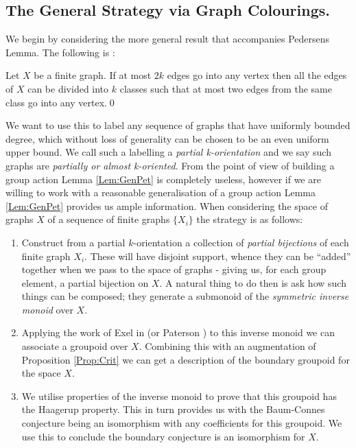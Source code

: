 \begin{conjecture}
\subsection{The General Strategy via Graph Colourings.}

We begin by considering the more general result that accompanies Pedersens Lemma. The following is \cite[Theorem 6, Chapter XI]{MR1035708}:

\begin{lemma}\label{Lem:GenPet}
Let $X$ be a finite graph. If at most $2k$ edges go into any vertex then all the edges of $X$ can be divided into $k$ classes such that at most two edges from the same class go into any vertex.\qed
\end{lemma}

We want to use this to label any sequence of graphs that have uniformly bounded degree, which without loss of generality can be chosen to be an even uniform upper bound. We call such a labelling a \textit{partial k-orientation} and we say such graphs are \textit{partially or almost k-oriented}. From the point of view of building a group action Lemma \ref{Lem:GenPet} is completely useless, however if we are willing to work with a reasonable generalisation of a group action Lemma \ref{Lem:GenPet} provides us ample information. When considering the space of graphs $X$ of a sequence of finite graphs $\lbrace X_{i} \rbrace$ the strategy is as follows: 
\begin{enumerate}
\item Construct from a partial $k$-orientation a collection of \textit{partial bijections} of each finite graph $X_{i}$. These will have disjoint support, whence they can be ``added'' together when we pass to the space of graphs - giving us, for each group element, a partial bijection on $X$. A natural thing to do then is ask how such things can be composed; they generate a submonoid of the \textit{symmetric inverse monoid} over $X$.

\item Applying the work of Exel in \cite{MR2419901} (or Paterson \cite{MR1724106}) to this inverse monoid we can associate a groupoid over $X$. Combining this with an augmentation of Proposition \ref{Prop:Crit} we can get a description of the boundary groupoid for the space $X$.

\item We utilise properties of the inverse monoid to prove that this groupoid has the Haagerup property. This in turn provides us with the Baum-Connes conjecture being an isomorphism with any coefficients for this groupoid. We use this to conclude the boundary conjecture is an isomorphism for $X$.
\end{enumerate}


\end{conjecture}
